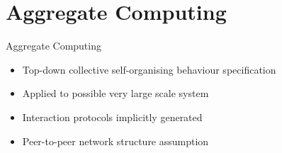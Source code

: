 \section{Aggregate Computing}
\begin{frame}{Aggregate Computing}
  \begin{cardTiny}
    \begin{itemize}
      \item Top-down collective self-organising behaviour specification
      \item Applied to possible very large scale system
      \item Interaction protocols implicitly generated
      \item[\failure{\faThumbsDown}] Peer-to-peer network structure assumption
    \end{itemize}
  \end{cardTiny}
  \centering
  \begin{multicols}{2}
    \raggedleft
  \end{multicols}
\end{frame}
